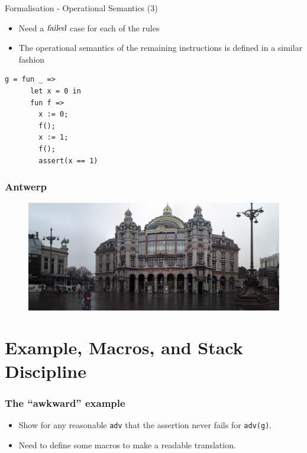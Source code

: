 \documentclass{beamer}
\newcommand{\failed}{\textsl{failed}}
\begin{document}
\begin{frame}{Formalisation - Operational Semantics (3)}
  \begin{itemize}[<+->]
  \item Need a $\failed$ case for each of the rules
  \item The operational semantics of the remaining instructions is defined in a similar fashion
  \end{itemize}
\end{frame}

\begin{lrbox}{\awkwardex}
\begin{lstlisting}
g = fun _ => 
      let x = 0 in
      fun f =>
        x := 0;
        f();
        x := 1;
        f();
        assert(x == 1)
\end{lstlisting}
\end{lrbox}

\begin{frame}
  \frametitle{Antwerp}
  \begin{figure}
    \centering
    \includegraphics[scale=0.2]{ant}
\end{figure}
\end{frame}

\section{Example, Macros, and Stack Discipline}

\begin{frame}
  \frametitle{The ``awkward'' example }
      \usebox{\awkwardex}      
      \begin{itemize}
      \item<2-> Show for any reasonable \texttt{adv} that the assertion never fails for \texttt{adv(g)}.
      \item<3-> Need to define some macros to make a readable translation.
      \end{itemize}
\end{frame}
\end{document}
